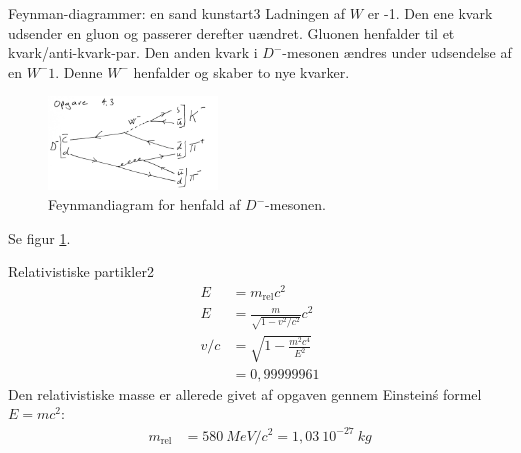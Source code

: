 \begin{opgave}{Feynman-diagrammer: en sand kunstart}{3}
\label{opg:feynman1}
\opg Ladningen af $W$ er -1.
\opg Den ene kvark udsender en gluon og passerer derefter uændret. Gluonen henfalder til et kvark/anti-kvark-par. Den anden kvark i $D^-$-mesonen ændres under udsendelse af en $W^-1$. Denne $W^-$ henfalder og skaber to nye kvarker.
\opg 
\begin{figure}[h]
  \centering
  \includegraphics[width=0.4\textwidth]{KernePartikel/opg43.png}
  \caption{Feynmandiagram for henfald af $D^-$-mesonen.}
  \label{fig:opg43}
\end{figure}
Se figur \ref{fig:opg43}.
\bigskip
\end{opgave}

\begin{opgave}{Relativistiske partikler}{2}
\opg 
\begin{align*}
E & = m_\text{rel} c^2 \\
E & = \frac{m}{\sqrt{1-v^2/c^2}} c^2 \\
v/c & = \sqrt{1-\frac{m^2 c^4}{E^2}} \\
&= 0,99999961
\end{align*}
\opg Den relativistiske masse er allerede givet af opgaven gennem Einstein\'s formel $E=mc^2$:
\begin{align*}
m_\text{rel} & = 580~\si{MeV/c^2} = 1,03~ 10^{-27} ~\si{kg}
\end{align*}
\end{opgave}

